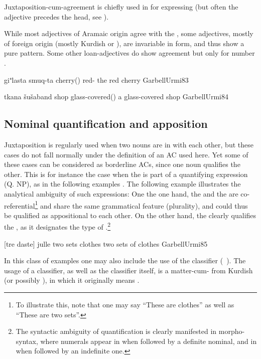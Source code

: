  Juxtaposition-cum-agreement is chiefly used in \JUrm for expressing  (but often the adjective precedes the head, see  ).
 
  While most adjectives of Aramaic origin agree with the \prim, some adjectives, mostly of foreign origin (mostly Kurdish or ), are invariable in form, and thus show a pure  pattern. Some other loan-adjectives do show agreement but only for number \citep[181]{KhanUrmi}.
 
 {gi⁺lasta smuq-ta}
 {cherry(\fem) red-\fem}
 {the red cherry}
 {GarbellUrmi}{83}
 
 {tkana šušaband}
 {shop glass-covered(\invar)}
 {a glass-covered shop}
 {GarbellUrmi}{84}
 
 
 

 \subsection{Nominal quantification and apposition} \label{ss:JUrm_quant}
 
 Juxtaposition is regularly used when two nouns are in   with each other, but these cases do not fall normally under the definition of an AC used here. Yet some of these cases can be considered as borderline ACs, since one noun qualifies the other. This is for instance the case when the  is part of a quantifying expression (Q. NP), as in the following examples \citep[see further][233--234]{KhanUrmi}. The following example illustrates the analytical ambiguity of such expressions: One the one hand, the \prim and the \secn are co-referential\footnote{To illustrate this, note that one may say \enquote{These are clothes} as well as \enquote{These are two sets}.} and share the same grammatical feature (plurality), and could thus be qualified as appositional to each other. On the other hand, the \secn {} clearly qualifies the \prim, as it designates the type of .\footnote{The syntactic ambiguity of quantification is clearly manifested in  morpho-syntax, where numerals appear in \cst* when followed by a definite nominal, and in \free* when followed by an indefinite one.}
 
 
 
 {[tre daste] julle}
 {two sets clothes}
 {two sets of clothes}
 {GarbellUrmi}{85}
 
 In this class of examples one may also include the use of the  classifier  (\pl\ ). The usage of a classifier, as well as the classifier itself, is a matter-cum- from Kurdish (or possibly ), in which it originally means  \citep[172, \S 2.32.12.4(a)]{Garbell1965impact}.
 
